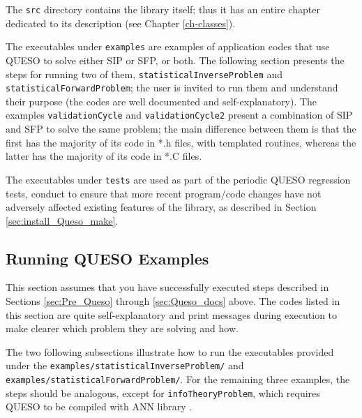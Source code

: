 The \verb+src+ directory contains the library itself; thus it has an entire chapter dedicated to its description (see Chapter \ref{ch-classes}).

The executables under \verb+examples+ are examples of application codes that use QUESO to solve either SIP or SFP, or both. The following section presents the steps for running two of them, \verb+statisticalInverseProblem+ and \verb+statisticalForwardProblem+; the user is invited to run them and understand their purpose (the codes are well documented and self-explanatory). The examples \verb+validationCycle+ and \verb+validationCycle2+ present a combination of SIP and SFP to solve the same problem; the main difference between them is that the first has the majority of its code in *.h files, with templated routines, whereas the latter has the majority of its code in *.C files.


The executables under \verb+tests+ are used as part of the periodic QUESO regression tests, conduct to ensure that more recent program/code
changes have not adversely affected existing features of the library, as described in Section \ref{sec:install_Queso_make}.


% 


\subsection{Running QUESO Examples} \label{sc-running-execs}

This section assumes that you have successfully executed steps described in Sections \ref{sec:Pre_Queso} through \ref{sec:Queso_docs} above.
The codes listed in this section are quite self-explanatory and print messages during execution to make clearer which problem they are solving and how. 


The two following subsections illustrate how to run the executables provided under the \verb+examples/statisticalInverseProblem/+ and \verb+examples/statisticalForwardProblem/+. For the remaining three examples, the steps should be analogous, except for \verb+infoTheoryProblem+, which requires QUESO to be compiled with ANN library \cite{ANN}.


